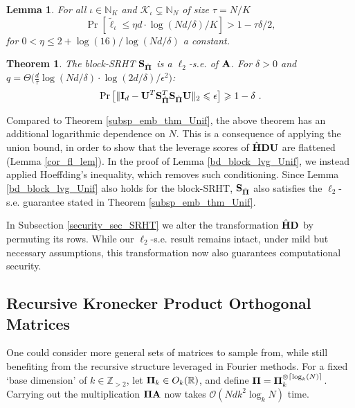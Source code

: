 \documentclass[journal,letterpaper,onecolumn,twoside,nofonttune]{IEEEtran}
\newcommand{\ow}{\mathcal{O}}
\newcommand{\K}{\mathcal{K}}
\newcommand{\Ub}{\bold{U}}
\newcommand{\Pibold}{\bold{\Pi}}
\newcommand{\Pibh}{\hat{\Pibold}}
\newcommand{\Omb}{\bold{\Omega}}
\newcommand{\Ombwt}{\widetilde{\Omb}}
\newcommand{\Z}{\mathbb{Z}}
\newcommand{\R}{\mathbb{R}}
\newcommand{\N}{\mathbb{N}}
\newcommand{\Sb}{\bold{S}}
\newcommand{\SbPh}{\Sb_{\Pibh}}
\newcommand{\Ab}{\bold{A}}
\newcommand{\Db}{\bold{D}}
\newcommand{\Ib}{\bold{I}}
\newcommand{\Hbh}{\hat{\bold{H}}}
\DeclarePairedDelimiter\ceil{\lceil}{\rceil}
\newtheorem{Thm}{Theorem}
\newtheorem{Lemma}{Lemma}
\begin{document}
\begin{Lemma}
\label{bd_block_lvg_Had}
For all $\iota\in\N_K$ and $\K_\iota\subsetneq\N_N$ of size $\tau=N/K$
\begin{equation}
\label{bl_lvg_had_flatten}
  \Pr\left[\tilde{\ell}_\iota\leqslant \eta d\cdot\log(Nd/\delta)/K\right]>1-\tau\delta/2,
\end{equation}
for $0<\eta\leqslant 2+\log(16)/\log(Nd/\delta)$ a constant.
\end{Lemma}

\begin{Thm}
\label{subsp_emb_thm_SRHT}
The block-SRHT $\SbPh$ is a $\ell_2$-s.e. of $\Ab$. For $\delta>0$ and $q=\Theta\big(\frac{d}{\tau}\log(Nd/\delta)\cdot\log(2d/\delta)/\epsilon^2\big)$:
$$ \Pr\big[\|\Ib_d-\Ub^T\SbPh^T\SbPh \Ub\|_2\leqslant\epsilon\big]\geqslant 1-\delta \ . $$
\end{Thm}

Compared to Theorem \ref{subsp_emb_thm_Unif}, the above theorem has an additional logarithmic dependence on $N$. This is a consequence of applying the union bound, in order to show that the leverage scores of $\Hbh\Db\Ub$ are flattened (Lemma \ref{cor_fl_lem}). In the proof of Lemma \ref{bd_block_lvg_Unif}, we instead applied Hoeffding’s inequality, which removes such conditioning. Since Lemma \ref{bd_block_lvg_Unif} also holds for the block-SRHT, $\SbPh$ also satisfies the $\ell_2$-s.e. guarantee stated in Theorem \ref{subsp_emb_thm_Unif}.

In Subsection \ref{security_sec_SRHT} we alter the transformation $\Hbh\Db$ by permuting its rows. While our $\ell_2$-s.e. result remains intact, under mild but necessary assumptions, this transformation now also guarantees computational security.

\subsection{Recursive Kronecker Product Orthogonal Matrices}

One could consider more general sets of matrices to sample from, while still benefiting from the recursive structure leveraged in Fourier methods. For a fixed `base dimension' of $k\in\Z_{>2}$, let $\Pibold_k\in O_k(\R)$, and define $\Pibold=\Pibold_k^{\otimes \ceil{\log_k(N)}}$. Carrying out the multiplication $\Pibold\Ab$ now takes $\ow(Ndk^2\log_k N)$ time.
\end{document}
